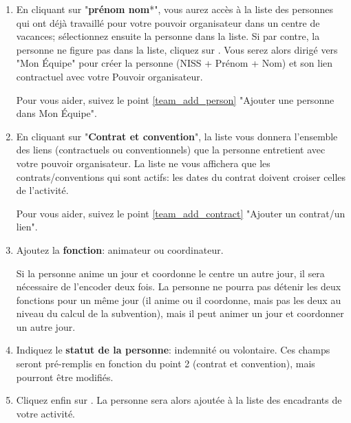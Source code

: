 \begin{enumerate}
    \item En cliquant sur "\textbf{prénom nom}*", vous aurez accès à la liste des personnes qui ont déjà travaillé pour votre pouvoir organisateur dans un centre de vacances;  sélectionnez ensuite la personne dans la liste. Si par contre, la personne ne figure pas dans la liste, cliquez sur . Vous serez alors dirigé vers "Mon Équipe" pour créer la personne (NISS + Prénom + Nom) et son lien contractuel avec votre Pouvoir organisateur. 
    \begin{conseil}
     Pour vous aider, suivez le point \ref{team_add_person} "Ajouter une personne dans Mon Équipe".
    \end{conseil}
    
    \item En cliquant sur "\textbf{Contrat et convention}", la liste vous donnera l'ensemble des liens (contractuels ou conventionnels) que la personne entretient avec votre pouvoir organisateur. La liste ne vous affichera que les contrats/conventions qui sont actifs: les dates du contrat doivent croiser celles de l'activité. 
    \begin{conseil}
     Pour vous aider, suivez le point \ref{team_add_contract} "Ajouter un contrat/un lien".
    \end{conseil}    
    
    
    \item Ajoutez la \textbf{fonction}: animateur ou coordinateur. 
        \begin{attention}
         Si la personne anime un jour et coordonne le centre un autre jour, il sera nécessaire de l'encoder deux fois. La personne ne pourra pas détenir les deux fonctions pour un même jour (il anime ou il coordonne, mais pas les deux au niveau du calcul de la subvention), mais il peut animer un jour et coordonner un autre jour.
        \end{attention}
    
    
    \item Indiquez le \textbf{statut de la personne}: indemnité ou volontaire. Ces champs seront pré-remplis en fonction du point 2 (contrat et convention), mais pourront être modifiés. 
    \item Cliquez enfin sur . La personne sera alors ajoutée à la liste des encadrants de votre activité.
\end{enumerate}

